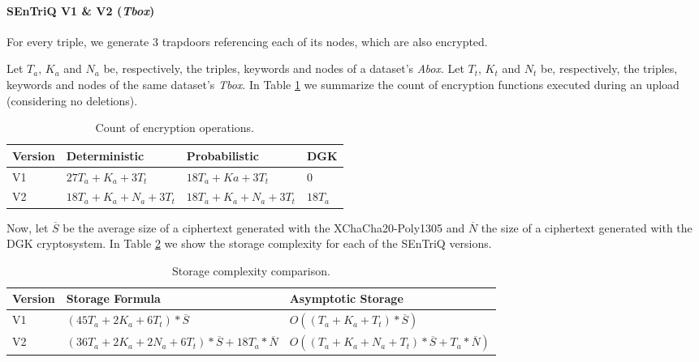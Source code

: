 \paragraph{SEnTriQ V1 \& V2 (\emph{Tbox})} For every triple, we generate 3 trapdoors referencing each of its nodes, which are also encrypted.

Let $T_a$, $K_a$ and $N_a$ be, respectively, the triples, keywords and nodes of a dataset's \emph{Abox}. Let $T_t$, $K_t$ and $N_t$ be, respectively, the triples, keywords and nodes of the same dataset's \emph{Tbox}. In Table \ref{tbl:storage-complexity:count} we summarize the count of encryption functions executed during an upload (considering no deletions).


\begin{table}[!ht]
    \centering
    \begin{tabular}{|l|l|l|l|}
    \hline
         \textbf{Version} & \textbf{Deterministic} & \textbf{Probabilistic} & \textbf{DGK} \\ \hline
        V1 & $27T_a + K_a + 3T_t$ & $18T_a + Ka + 3T_t$ & 0 \\ \hline
        V2 & $18T_a + K_a + N_a + 3T_t$ & $18T_a + K_a + N_a + 3T_t$ & $18T_a$ \\ \hline
    \end{tabular}
    \caption{Count of encryption operations.}
    \label{tbl:storage-complexity:count}
\end{table}

Now, let $\overline{S}$ be the average size of a ciphertext generated with the XChaCha20-Poly1305 and $\overline{N}$ the size of a ciphertext generated with the \gls{DGK} cryptosystem. In Table \ref{tbl:storage-complexity:formulas} we show the storage complexity for each of the \gls{SEnTriQ} versions.

\begin{table}[H]
    \centering
    \begin{tabular}{|l|l|l|}
    \hline
        \textbf{Version} & \textbf{Storage Formula} & \textbf{Asymptotic Storage} \\
        \hline
        V1 & $(45T_a + 2K_a + 6T_t) * \overline{S}$ & $O\!\left((T_a + K_a + T_t) * \overline{S}\right)$ \\
        \hline
        V2 & $(36T_a + 2K_a + 2N_a + 6T_t) * \overline{S} + 18T_a * \overline{N}$  & $O\!\left((T_a + K_a + N_a + T_t) * \overline{S} + T_a * \overline{N}\right)$ \\
        \hline
    \end{tabular}
    \caption{Storage complexity comparison.}
    \label{tbl:storage-complexity:formulas}
\end{table}


